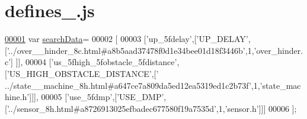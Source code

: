 \hypertarget{defines__11_8js_source}{}\section{defines\+\_.\+js}
\label{defines__11_8js_source}

\begin{DoxyCode}
\hypertarget{defines__11_8js_source.tex_l00001}{}\hyperlink{defines__11_8js_ad01a7523f103d6242ef9b0451861231e}{00001} var \hyperlink{defines__11_8js_ad01a7523f103d6242ef9b0451861231e}{searchData}=
00002 [
00003   [\textcolor{stringliteral}{'up\_5fdelay'},[\textcolor{stringliteral}{'UP\_DELAY'},[\textcolor{stringliteral}{'../over\_\_hinder\_8c.html#a8b5aad37478f0d1e34bee01d18f3446b'},1,\textcolor{stringliteral}{'over\_hinder.c'}]
      ]],
00004   [\textcolor{stringliteral}{'us\_5fhigh\_5fobstacle\_5fdistance'},[\textcolor{stringliteral}{'US\_HIGH\_OBSTACLE\_DISTANCE'},[\textcolor{stringliteral}{'
      ../state\_\_machine\_8h.html#a647ce7a809da5ed12ea5319ed1c2b73f'},1,\textcolor{stringliteral}{'state\_machine.h'}]]],
00005   [\textcolor{stringliteral}{'use\_5fdmp'},[\textcolor{stringliteral}{'USE\_DMP'},[\textcolor{stringliteral}{'../sensor\_8h.html#a8726913025efbadec677580f19a7535d'},1,\textcolor{stringliteral}{'sensor.h'}]]]
00006 ];
\end{DoxyCode}

